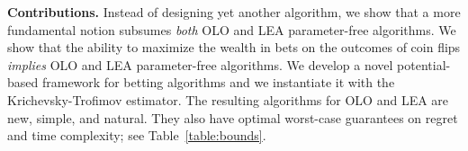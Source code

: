 
\textbf{Contributions.} Instead of designing yet another algorithm, we show that a more fundamental notion subsumes
\emph{both} \ac{OLO} and \ac{LEA} parameter-free algorithms. We show that the
ability to maximize the wealth in bets on the outcomes of coin flips
\emph{implies} \ac{OLO} and \ac{LEA} parameter-free algorithms. We develop a
novel potential-based framework for betting algorithms and we instantiate it
with the Krichevsky-Trofimov estimator.  The resulting algorithms for \ac{OLO}
and \ac{LEA} are new, simple, and natural.  They also have optimal worst-case
guarantees on regret and time complexity; see Table~\ref{table:bounds}.
